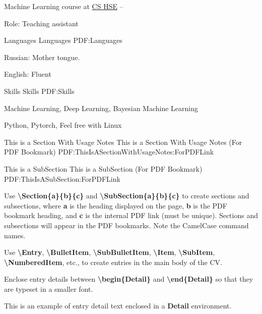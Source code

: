 \documentclass[letterpaper,MMMyyyy,nonstopmode]{simpleresumecv}
\newcommand{\Code}[1]{\mbox{\textbf{#1}}}
\newcommand{\CodeCommand}[1]{\mbox{\textbf{\textbackslash{#1}}}}
\begin{document}
\begin{Body}
\Gap

\BulletItem
Machine Learning course at \href{https://cs.hse.ru/en/}{CS HSE}
\hfill
{} --
\begin{Detail}
\Item
Role: Teaching assistant
\end{Detail}



\Section
{Languages}
{Languages}
{PDF:Languages}

\BulletItem
Russian: Mother tongue.

\Gap
\BulletItem
English: Fluent


\Section
{Skills}
{Skills}
{PDF:Skills}

\BulletItem
Machine Learning, Deep Learning, Bayesian Machine Learning

\BulletItem
Python, Pytorch, Feel free with Linux

\iffalse

\begingroup
\color{red}

\Section
{This is a\newline
Section\newline
With\newline
Usage Notes}
{This is a Section With Usage Notes (For PDF Bookmark)}
{PDF:ThisIsASectionWithUsageNotes:ForPDFLink}

\SubSection
{This is a SubSection}
{This is a SubSection (For PDF Bookmark)}
{PDF:ThisIsASubSection:ForPDFLink}

\Gap
\BulletItem
Use \CodeCommand{Section\{a\}\{b\}\{c\}} and
\CodeCommand{SubSection\{a\}\{b\}\{c\}}
to create sections and subsections, where
\Code{a} is the heading displayed on the page,
\Code{b} is the PDF bookmark heading, and
\Code{c} is the internal PDF link (must be unique).
Sections and subsections will appear in the PDF bookmarks.
Note the CamelCase command names.

\Gap
\BulletItem
Use
\CodeCommand{Entry},
\CodeCommand{BulletItem},
\CodeCommand{SubBulletItem},
\CodeCommand{Item},
\CodeCommand{SubItem},
\CodeCommand{NumberedItem},
etc.,
to create entries in the main body of the CV.

\Gap
\BulletItem
Enclose entry details between
\CodeCommand{begin\{Detail\}} and
\CodeCommand{end\{Detail\}}
so that they are typeset in a smaller font.
\begin{Detail}
\Item
This is an example of entry detail text enclosed in a \Code{Detail} environment.
\end{Detail}


\end{Body}
\end{document}
